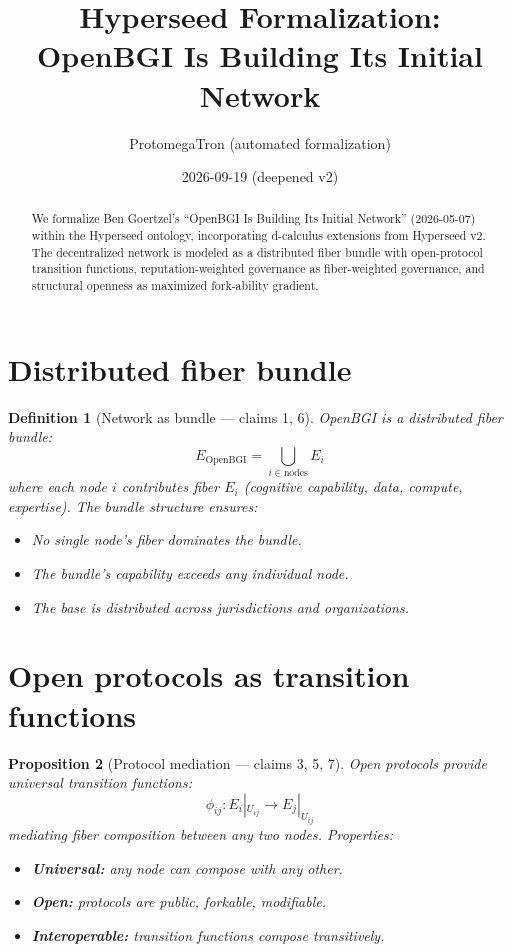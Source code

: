 \documentclass[11pt,a4paper]{article}
\title{Hyperseed Formalization:\\
  OpenBGI Is Building Its Initial Network}
\author{ProtomegaTron (automated formalization)}
\date{2026-09-19 (deepened v2)}
\newtheorem{definition}{Definition}[section]
\newtheorem{proposition}[definition]{Proposition}
\begin{document}
\maketitle

\begin{abstract}
We formalize Ben Goertzel's ``OpenBGI Is Building Its Initial Network''
(2026-05-07) within the Hyperseed ontology, incorporating d-calculus
extensions from Hyperseed v2. The decentralized network is modeled as a
distributed fiber bundle with open-protocol transition functions,
reputation-weighted governance as fiber-weighted governance, and
structural openness as maximized fork-ability gradient.
\end{abstract}

\tableofcontents

\section{Distributed fiber bundle}

\begin{definition}[Network as bundle --- claims 1, 6]
OpenBGI is a distributed fiber bundle:
\[
  E_{\text{OpenBGI}} = \bigcup_{i \in \text{nodes}} E_i
\]
where each node $i$ contributes fiber $E_i$ (cognitive capability, data,
compute, expertise). The bundle structure ensures:
\begin{itemize}
  \item No single node's fiber dominates the bundle.
  \item The bundle's capability exceeds any individual node.
  \item The base is distributed across jurisdictions and organizations.
\end{itemize}
\end{definition}

\section{Open protocols as transition functions}

\begin{proposition}[Protocol mediation --- claims 3, 5, 7]
\label{prop:protocols}
Open protocols provide universal transition functions:
\[
  \phi_{ij}: E_i|_{U_{ij}} \to E_j|_{U_{ij}}
\]
mediating fiber composition between any two nodes. Properties:
\begin{itemize}
  \item \textbf{Universal:} any node can compose with any other.
  \item \textbf{Open:} protocols are public, forkable, modifiable.
  \item \textbf{Interoperable:} transition functions compose transitively.
\end{itemize}
\end{proposition}
\end{document}
